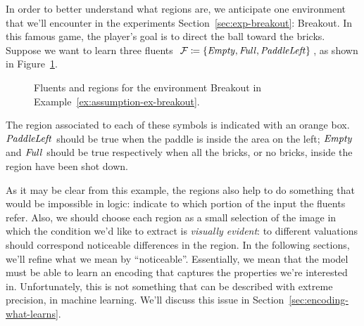 \begin{example}
	In order to better understand what regions are, we anticipate one
	environment that we'll encounter in the experiments
	Section~\ref{sec:exp-breakout}: Breakout. In this famous game, the player's
	goal is to direct the ball toward the bricks. Suppose we want to learn three
	fluents~$\mathcal{F} \coloneqq \{\text{\textit{Empty}}, \text{\textit{Full}},
	\text{\textit{PaddleLeft}}\}$, as shown in Figure~\ref{fig:assumption-ex-breakout}.
	\begin{figure}
		\centering
		\caption{Fluents and regions for the environment Breakout in
		Example~\ref{ex:assumption-ex-breakout}.}
		\label{fig:assumption-ex-breakout}
	\end{figure}
	The region associated to each of these symbols is indicated with an orange
	box. $\text{\textit{PaddleLeft}}$ should be true when the paddle is inside the
	area on the left; $\text{\textit{Empty}}$ and $\text{\textit{Full}}$ should be true
	respectively when all the bricks, or no bricks, inside the region have been
	shot down.
	\label{ex:assumption-ex-breakout}
\end{example}

As it may be clear from this example, the regions also help to do something
that would be impossible in logic: indicate to which portion of the input the
fluents refer. Also, we should choose each region as a small selection of
the image in which the condition we'd like to extract is \emph{visually
evident}: to different valuations should correspond noticeable differences
in the region. In the following sections, we'll refine what we mean by
``noticeable''. Essentially, we mean that the model must be able to learn an
encoding that captures the properties we're interested in. Unfortunately,
this is not something that can be described with extreme precision, in machine
learning. We'll discuss this issue in Section~\ref{sec:encoding-what-learns}.

